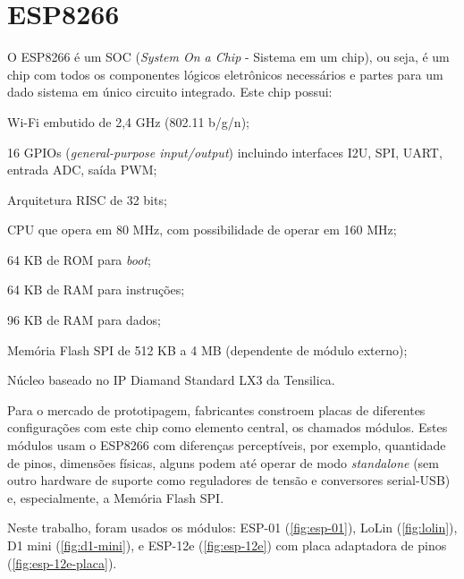 \section{ESP8266}
\label{sec:ESP8266}

O ESP8266 é um SOC (\emph{System On a Chip} - Sistema em um chip),
ou seja, é um chip com todos os componentes lógicos
eletrônicos necessários e partes para um dado sistema em único circuito
integrado. Este chip possui:


\begin{alineas}
	\item Wi-Fi embutido de 2,4 GHz (802.11 b/g/n);

	\item 16 GPIOs (\emph{general-purpose input/output}) incluindo interfaces
 I2U, SPI, UART, entrada ADC, saída PWM;

	\item Arquitetura RISC de 32 bits;

	\item CPU que opera em  80 MHz, com possibilidade de operar em 160 MHz;

	\item 64 KB de ROM para \emph{boot};

	\item 64 KB de RAM para instruções;

	\item 96 KB de RAM para dados;

	\item Memória Flash SPI de 512 KB a 4 MB (dependente de módulo externo);

	\item Núcleo baseado no IP Diamand Standard LX3 da Tensilica.

\end{alineas}

Para o mercado de prototipagem, fabricantes constroem placas de diferentes
configurações com este chip como elemento central, os chamados módulos. Estes
módulos usam o ESP8266 com diferenças perceptíveis, por exemplo, quantidade de
pinos, dimensões físicas, alguns podem até operar de modo \emph{standalone} (sem
outro hardware de suporte como reguladores de tensão e conversores serial-USB)
e, especialmente, a Memória Flash SPI.

Neste trabalho, foram usados os módulos: ESP-01 (\autoref{fig:esp-01}), LoLin
(\autoref{fig:lolin}), D1 mini (\autoref{fig:d1-mini}),  e ESP-12e
(\autoref{fig:esp-12e}) com placa adaptadora de pinos
(\autoref{fig:esp-12e-placa}).

